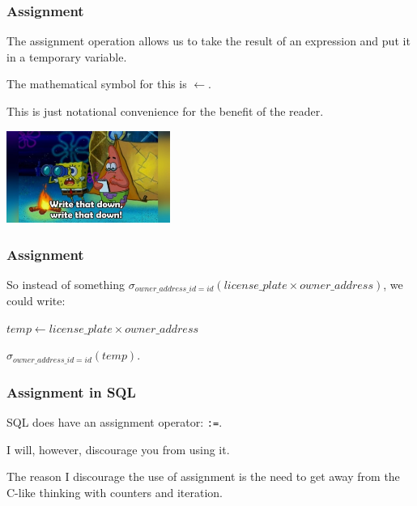 \begin{frame}
\frametitle{Assignment}

The \alert{assignment} operation allows us to take the result of an expression and put it in a temporary variable. 

The mathematical symbol for this is $\leftarrow$.

This is just notational convenience for the benefit of the reader. 

\begin{center}
	\includegraphics[width=0.4\textwidth]{images/writedown.jpg}
\end{center}

\end{frame}




\begin{frame}
\frametitle{Assignment}

So instead of something $\sigma_{owner\_address\_id = id}( license\_plate \times owner\_address )$, we could write: 

$temp \leftarrow license\_plate \times owner\_address$


$\sigma_{owner\_address\_id = id}( temp ) $.



\end{frame}



\begin{frame}
\frametitle{Assignment in SQL}

SQL does have an assignment operator: \texttt{:=}. 

I will, however, discourage you from using it.

The reason I discourage the use of assignment is the need to get away from the C-like thinking with counters and iteration.


\end{frame}




